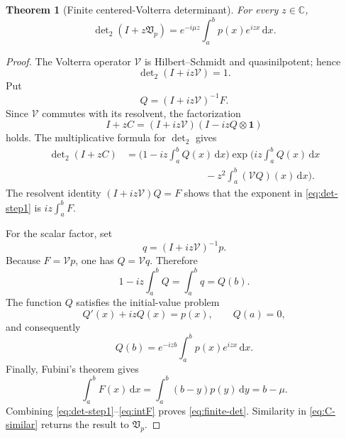 \documentclass[11pt,reqno]{amsart}
\numberwithin{equation}{section}
\newtheorem{theorem}{Theorem}[section]
\newcommand{\C}{\mathbb C}
\newcommand{\1}{\mathbf 1}
\newcommand{\Vp}{\mathfrak V_p}
\newcommand{\dd}{\,\mathrm d}
\newcommand{\detTwo}{\det\nolimits_{2}}
\begin{document}
\begin{theorem}[Finite centered-Volterra determinant]\label{thm:finite-det}
For every $z\in\C$,
\begin{equation}\label{eq:finite-det}
 \boxed{
 \detTwo(I+z\Vp)
 =e^{-i\mu z}\int_a^bp(x)e^{izx}\dd x.}
\end{equation}
\end{theorem}

\begin{proof}
The Volterra operator $\mathcal V$ is Hilbert--Schmidt and quasinilpotent;
hence
\begin{equation}\label{eq:volterra-det2-one}
 \detTwo(I+iz\mathcal V)=1.
\end{equation}
Put
\[
 Q=(I+iz\mathcal V)^{-1}F.
\]
Since $\mathcal V$ commutes with its resolvent, the factorization
\begin{equation}\label{eq:finite-factor}
 I+zC=(I+iz\mathcal V)(I-izQ\otimes\1)
\end{equation}
holds.  The multiplicative formula for $\detTwo$ gives
\begin{equation}\label{eq:det-step1}
\begin{aligned}
 \detTwo(I+zC)
 &=\biggl(1-iz\int_a^bQ(x)\dd x\biggr)
 \exp\biggl(
 iz\int_a^bQ(x)\dd x\\
 &\hspace{8em}
 -z^2\int_a^b(\mathcal VQ)(x)\dd x\biggr).
\end{aligned}
\end{equation}
The resolvent identity $(I+iz\mathcal V)Q=F$ shows that the exponent in
\eqref{eq:det-step1} is $iz\int_a^bF$.

For the scalar factor, set
\[
 q=(I+iz\mathcal V)^{-1}p.
\]
Because $F=\mathcal Vp$, one has $Q=\mathcal Vq$.  Therefore
\begin{equation}\label{eq:bracket-Qb}
 1-iz\int_a^bQ=\int_a^bq=Q(b).
\end{equation}
The function $Q$ satisfies the initial-value problem
\begin{equation}\label{eq:Q-ode}
 Q'(x)+izQ(x)=p(x),
 \qquad Q(a)=0,
\end{equation}
and consequently
\begin{equation}\label{eq:Qb-fourier}
 Q(b)=e^{-izb}\int_a^bp(x)e^{izx}\dd x.
\end{equation}
Finally, Fubini's theorem gives
\begin{equation}\label{eq:intF}
 \int_a^bF(x)\dd x
 =\int_a^b(b-y)p(y)\dd y=b-\mu.
\end{equation}
Combining \eqref{eq:det-step1}--\eqref{eq:intF} proves
\eqref{eq:finite-det}.  Similarity in \eqref{eq:C-similar} returns the result
to $\Vp$.
\end{proof}
\end{document}
